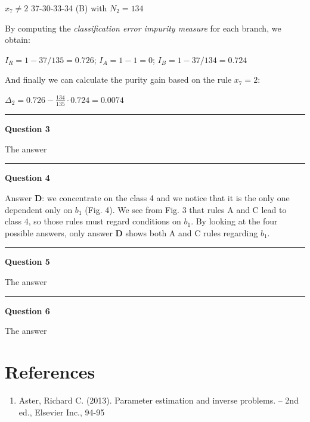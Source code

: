 \documentclass[
]{article}
\providecommand{\tightlist}{%
  \setlength{\itemsep}{0pt}\setlength{\parskip}{0pt}}
\begin{document}
\(x_7 \neq 2\) 37-30-33-34 (B) with \(N_2=134\)

By computing the \emph{classification error impurity measure} for each
branch, we obtain:

\(I_R=1-37/135=0.726\); \(I_A=1-1=0\); \(I_B=1-37/134=0.724\)

And finally we can calculate the purity gain based on the rule
\(x_7=2\):

\(\Delta_2=0.726-\frac{134}{135}\cdot 0.724=0.0074\)

\begin{center}\rule{0.5\linewidth}{0.5pt}\end{center}

\textbf{Question 3}

The answer

\begin{center}\rule{0.5\linewidth}{0.5pt}\end{center}

\textbf{Question 4}

Answer \textbf{D}: we concentrate on the class 4 and we notice that it
is the only one dependent only on \(b_1\) (Fig. 4). We see from Fig. 3
that rules A and C lead to class 4, so those rules must regard
conditions on \(b_1\). By looking at the four possible answers, only
answer \textbf{D} shows both A and C rules regarding \(b_1\).

\begin{center}\rule{0.5\linewidth}{0.5pt}\end{center}

\textbf{Question 5}

The answer

\begin{center}\rule{0.5\linewidth}{0.5pt}\end{center}

\textbf{Question 6}

The answer

\newpage

\hypertarget{references}{%
\section{References}\label{references}}

\begin{enumerate}
\def\labelenumi{\arabic{enumi})}
\tightlist
\item
  Aster, Richard C. (2013). Parameter estimation and inverse problems.
  -- 2nd ed., Elsevier Inc., 94-95
\end{enumerate}
\end{document}
